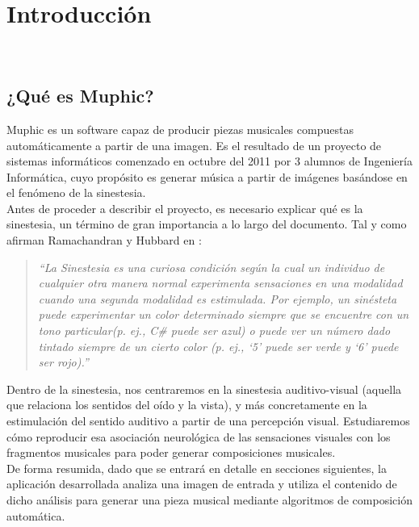 \chapter{Introducción}
\label{chap:intro}


\\

	\section{¿Qué es Muphic?}
	\label{sec:quees}
	
		\vspace{0.2in}
		Muphic es un software capaz de producir piezas musicales compuestas automáticamente a partir de una imagen. Es el resultado de un proyecto de sistemas informáticos comenzado en octubre del 2011 por 3 alumnos de Ingeniería Informática, cuyo propósito es generar música a partir de imágenes basándose en el fenómeno de la sinestesia.\\
		
		Antes de proceder a describir el proyecto, es necesario explicar qué es la sinestesia, un término de gran importancia a lo largo del documento. Tal y como afirman Ramachandran y Hubbard en \cite[pg.~4]{paperSyn}:
		
		\begin{quote}
		\emph{``La Sinestesia es una curiosa condición según la cual un individuo de cualquier otra manera normal experimenta sensaciones en una modalidad cuando una segunda modalidad es estimulada. Por ejemplo, un sinésteta puede experimentar un color determinado siempre que se encuentre con un tono particular(p. ej., C\# puede ser azul) o puede ver un número dado tintado siempre de un cierto color (p. ej., ‘5’ puede ser verde y ‘6’ puede ser rojo).''}
		\end{quote}
		
		Dentro de la sinestesia, nos centraremos en la sinestesia auditivo-visual (aquella que relaciona los sentidos del oído y la vista), y más concretamente en la estimulación del sentido auditivo a partir de una percepción visual. Estudiaremos cómo reproducir esa asociación neurológica de las sensaciones visuales con los fragmentos musicales para poder generar composiciones musicales.\\
		 
		
		De forma resumida, dado que se entrará en detalle en secciones siguientes, la aplicación desarrollada analiza una imagen de entrada y utiliza el contenido de dicho análisis para generar una pieza musical mediante algoritmos de composición automática.\\


